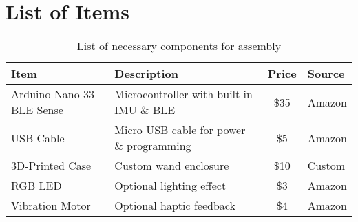 \section{List of Items}

\begin{table}[h]
	\centering
	\begin{tabular}{|l|l|c|l|}
		\hline
		\textbf{Item} & \textbf{Description} & \textbf{Price} & \textbf{Source} \\
		\hline
		Arduino Nano 33 BLE Sense & Microcontroller with built-in IMU \& BLE & \$35 & Amazon \\
		USB Cable & Micro USB cable for power \& programming & \$5 & Amazon \\
		3D-Printed Case & Custom wand enclosure & \$10 & Custom \\
		RGB LED & Optional lighting effect & \$3 & Amazon \\
		Vibration Motor & Optional haptic feedback & \$4 & Amazon \\
		\hline
	\end{tabular}
	\caption{List of necessary components for assembly}
\end{table}
